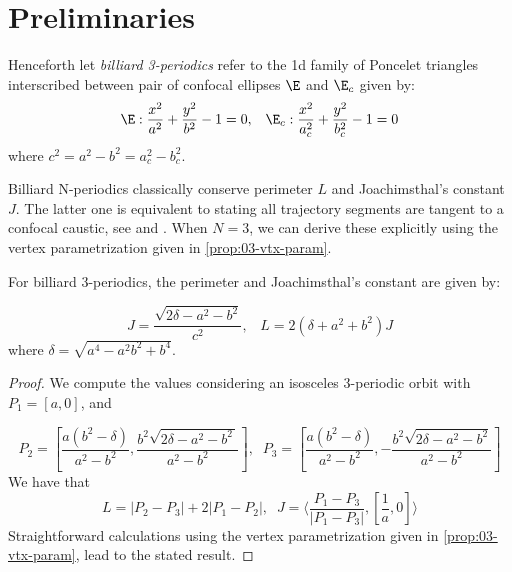 \section{Preliminaries}


Henceforth let {\em billiard 3-periodics} refer to the 1d family of Poncelet triangles interscribed between pair of confocal ellipses $\E$ and $\E_c$ given by:
\[ \E:\frac{x^2}{a^2}+\frac{y^2}{b^2}-1=0,\;\;\;\E_c:\frac{x^2}{a_c^2}+\frac{y^2}{b_c^2}-1=0\]
where $c^2=a^2-b^2=a_c^2-b_c^2$.


Billiard N-periodics classically conserve  perimeter $L$ and Joachimsthal's constant $J$. The latter one is equivalent to stating all trajectory segments are tangent to a confocal caustic, see \cite[Thm 4.4]{sergei91} and \cite{arnold2020-joachim}.
When $N=3$, we can derive these explicitly using the vertex parametrization given in \cref{prop:03-vtx-param}.
 

\begin{proposition}
For billiard 3-periodics, the perimeter and Joachimsthal's constant are given by:

\begin{equation*}
J=\frac{\sqrt{2\delta-a^2-b^2}}{c^2},\;\;\;L=2(\delta+a^2+b^2)J
\label{eqn:n3-L-J}
\end{equation*}
where $\delta=\sqrt{a^4-a^2b^2+b^4}$.
\end{proposition}

\begin{proof} We compute the values considering  an isosceles 3-periodic orbit with $P_1=[a,0]$, and

 {\small 
 \begin{equation} \label{eq:orbita3-isosceles}
 P_2=\left[   {\frac {a \left(  {b}^{2}-\delta \right) }{   a^2-b^2 
 			  }},{\frac {{b}^{2}\sqrt {2 \delta -{a}^{2}-{b}^{2}\,
 				}}{{a}^{2}-{b}^{2}}} 
 	\right], \;\; P_3=\left[  {\frac {a \left(  {b}^{2}-\delta \right) }{   a^2-b^2   
 	}},-{\frac {{b}^{2}\sqrt {2\delta-{a}^{2}-{b}^{2} 
 				}}{{a}^{2}-{b}^{2}}} 
 	\right]
 	\end{equation}
 	}
 	We have that
 	\[L=|P_2-P_3|+2|P_1-P_2|,\;\;
 	 J=\langle \frac{P_1-P_3}{|P_1-P_3|},[\frac{1}{a},0]\rangle\]
 	 Straightforward calculations using the vertex parametrization given in \cref{prop:03-vtx-param}, lead to the stated result.
\end{proof}

